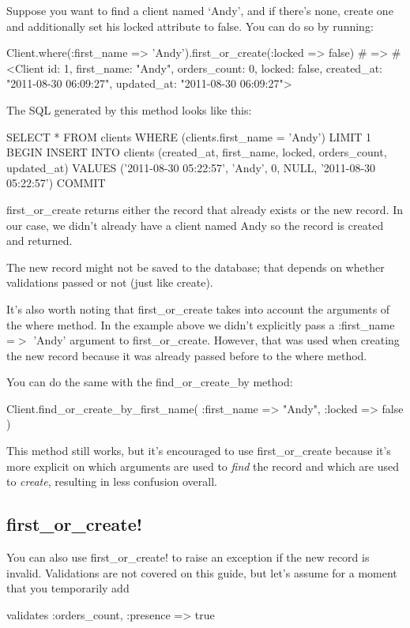 \documentclass[10pt]{book}
\newenvironment{code}{%
  \scriptsize
    \verbatim
}{%
    \endverbatim
    \newline
}
\begin{document}
Suppose you want to find a client named ‘Andy’, and if there’s none, create one and additionally set his locked attribute to false. You can do so by running:
\begin{code}
Client.where(:first_name => 'Andy').first_or_create(:locked => false)
#
 => #<Client id: 1, first_name: "Andy", orders_count: 0, locked: 
false, created_at: "2011-08-30 06:09:27", updated_at: "2011-08-30 
06:09:27">
\end{code}

The SQL generated by this method looks like this:
\begin{code}
SELECT * FROM clients WHERE (clients.first_name = 'Andy') LIMIT 1
BEGIN
INSERT INTO clients 
(created_at, first_name, locked, orders_count, updated_at) 
VALUES ('2011-08-30 05:22:57', 'Andy', 0, NULL, '2011-08-30 05:22:57')
COMMIT
\end{code}

first\_or\_create returns either the record that already  exists or the new record. In our case, we didn’t already have a client  named Andy so the record is created and returned.

The new record might not be saved to the database; that depends on whether validations passed or not (just like create).

It’s also worth noting that first\_or\_create takes into account the arguments of the where method. In the example above we didn’t explicitly pass a :first\_name =$>$ 'Andy' argument to first\_or\_create. However, that was used when creating the new record because it was already passed before to the where method.

You can do the same with the find\_or\_create\_by method:
\begin{code}
Client.find_or_create_by_first_name(
:first_name => "Andy", :locked => false
)
\end{code}

This method still works, but it’s encouraged to use first\_or\_create because it’s more explicit on which arguments are used to \emph{find} the record and which are used to \emph{create}, resulting in less confusion overall.

\subsection{ first\_or\_create!}

You can also use first\_or\_create! to raise an exception if  the new record is invalid. Validations are not covered on this guide,  but let’s assume for a moment that you temporarily add
\begin{code}
validates :orders_count, :presence => true
\end{code}
\end{document}
